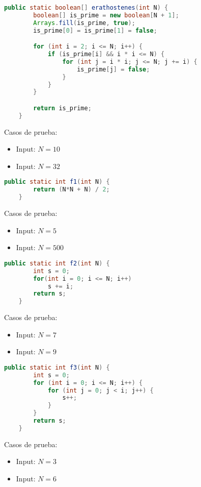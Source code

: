\documentclass[12pt]{article}
\begin{document}
\begin{lstlisting}[language=Java]
    public static boolean[] erathostenes(int N) {
        boolean[] is_prime = new boolean[N + 1];
        Arrays.fill(is_prime, true);
        is_prime[0] = is_prime[1] = false;

        for (int i = 2; i <= N; i++) {
            if (is_prime[i] && i * i <= N) {
                for (int j = i * i; j <= N; j += i) {
                    is_prime[j] = false;
                }
            }
        }

        return is_prime;
    }
\end{lstlisting}
Casos de prueba:
\begin{itemize}
    \item Input: $N = 10$
    \item Input: $N = 32$
\end{itemize}

\begin{lstlisting}[language=Java]
    public static int f1(int N) {
        return (N*N + N) / 2;
    }
\end{lstlisting}
Casos de prueba:
\begin{itemize}
    \item Input: $N = 5$
    \item Input: $N = 500$
\end{itemize}
\newpage
{}
\begin{lstlisting}[language=Java]
    public static int f2(int N) {
        int s = 0;
        for(int i = 0; i <= N; i++)
            s += i;
        return s;
    }
\end{lstlisting}
Casos de prueba:
\begin{itemize}
    \item Input: $N = 7$
    \item Input: $N = 9$
\end{itemize}

\begin{lstlisting}[language=Java]
    public static int f3(int N) {
        int s = 0;
        for (int i = 0; i <= N; i++) {
            for (int j = 0; j < i; j++) {
                s++;
            }
        }
        return s;
    }
\end{lstlisting}
Casos de prueba:
\begin{itemize}
    \item Input: $N = 3$
    \item Input: $N = 6$
\end{itemize}

    
\end{document}
